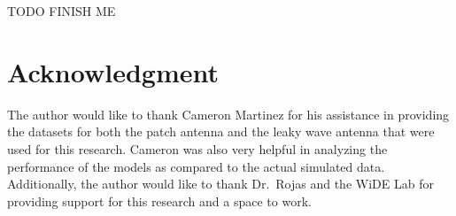 \documentclass[lettersize,journal]{IEEEtran}
\begin{document}
TODO FINISH ME 


\section*{Acknowledgment}
The author would like to thank Cameron Martinez for his assistance in providing the datasets for both the patch antenna and the leaky wave antenna that were used for this research. Cameron was also very helpful in analyzing the performance of the models as compared to the actual simulated data. Additionally, the author would like to thank Dr.~Rojas and the WiDE Lab for providing support for this research and a space to work.





\vfill
\end{document}
